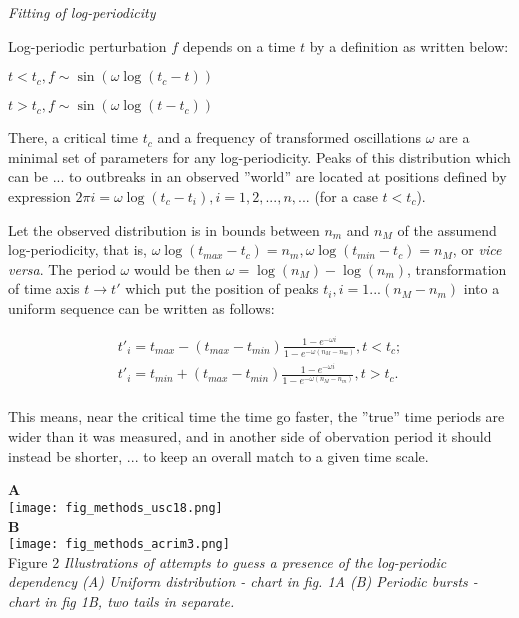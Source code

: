 \documentclass[a4paper]{article}
\begin{document}
\textit{Fitting of log-periodicity}

Log-periodic perturbation $f$ depends on a time $t$ by a definition as written below: 

$t < t_c, f \sim \sin( \omega \log( t_c - t ) )$

$t > t_c, f \sim \sin( \omega \log( t - t_c ) )$

There, a critical time $t_c$ and a frequency of transformed oscillations $\omega$ are a minimal set of parameters for any log-periodicity. Peaks of this distribution which can be ... to outbreaks in an observed ''world'' are located at positions defined by expression $ 2 \pi i =  \omega \log( t_c - t_i ), i = 1, 2,  ..., n, ... $ (for a case $t < t_c$).

Let the observed distribution is in bounds between $n_m$ and $n_M$ of the assumend log-periodicity, that is, $\omega \log( t_{max} - t_c )  = n_m, \omega \log( t_{min} - t_c ) = n_M$, or \textit{vice versa}. The period $\omega$ would be then $\omega = \log( n_M ) - \log( n_m ) $, transformation of time axis $t \to t'$ which put the position of peaks $t_i, i = 1 ... (n_M - n_m)$ into a uniform sequence can be written as follows:

\begin{eqnarray}
t'_i = t_{max} - ( t_{max} - t_{min} )\frac{ 1 - e^{ - \omega i } }{ 1 - e^{ - \omega (n_M - n_m) } }, t < t_c; \nonumber\\
t'_i = t_{min} + ( t_{max} - t_{min} )\frac{ 1 - e^{ - \omega i } }{ 1 - e^{ - \omega (n_M - n_m) } }, t > t_c. \\
\end{eqnarray}

This means, near the critical time the time go faster, the ''true'' time periods are wider than it was measured, and in another side of obervation period it should instead be shorter, ... to keep an overall match to a given time scale. 

\noindent
{\large{\textbf{A}}}\\
\texttt{[image: fig\_methods\_usc18.png]}\\
\vskip 12pt
\noindent
{\large{\textbf{B}}}\\
\texttt{[image: fig\_methods\_acrim3.png]}\\
\vskip 12pt
Figure 2 \textit{Illustrations of attempts to guess a presence of the log-periodic dependency (A) Uniform distribution - chart in fig. 1A (B) Periodic bursts - chart in fig 1B, two tails in separate.}
\vskip 12pt
\end{document}
